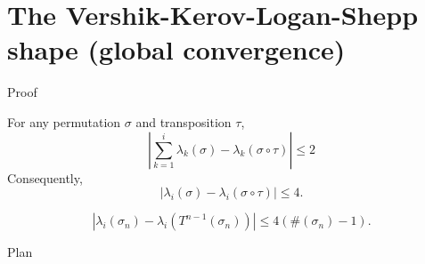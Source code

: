 \documentclass[english,xcolor=table]{beamer}
\begin{document}
\section{The Vershik-Kerov-Logan-Shepp shape (global convergence)}
\begin{frame}{Proof}
\begin{lemma} \label{lemma2}
For any permutation $\sigma$ and transposition  $\tau$,\begin{equation*} \label{sum}
\left|\sum_{k=1}^i \lambda_k(\sigma)-{\lambda}_k\left(\sigma\circ\tau\right)\right| \leq 2
\end{equation*}
Consequently, 
\begin{equation*} \label{sep}
\left|\lambda_i(\sigma)-\lambda_i\left(\sigma\circ\tau\right)\right| \leq 4.
\end{equation*}
\end{lemma}
\begin{corollary}
\begin{equation} \label{sep2}
\left|\lambda_i(\sigma_n)-\lambda_i\left(T^{n-1}(\sigma_n)\right)\right| \leq 4(\#(\sigma_n)-1).
\end{equation}
\end{corollary}
\end{frame}
\begin{frame}{Plan}
\tableofcontents[currentsection,currentsubsection,
    hideothersubsections, 
    sectionstyle=show/shaded,
]
\end{frame}
\end{document}
